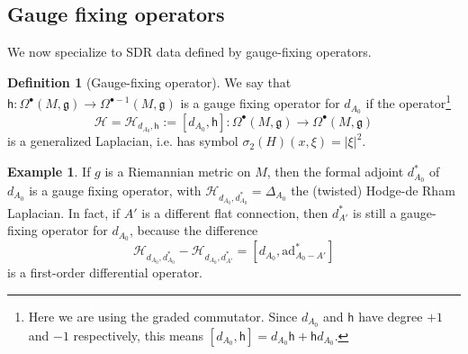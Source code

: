 \documentclass[11pt,a4paper]{amsart}
\theoremstyle{plain} %
\newtheorem{cor}[thm]{Corollary}
\theoremstyle{definition}
\newtheorem{defn}[thm]{Definition}
\newtheorem{expl}[thm]{Example}
\theoremstyle{remark}
\newcommand{\g}{\mathfrak{g}}
\newcommand{\sh}{\mathsf{h}}
\newcommand{\M}{\mathcal{M}}
\newcommand{\ad}{\mathrm{ad}}
\newcommand{\HHH}{\mathcal{H}}
\begin{document}
{%

\subsection{Gauge fixing operators}
We now specialize to SDR data defined by gauge-fixing operators. 
\begin{defn}[Gauge-fixing operator]
    We say that $\sh\colon \Omega^{\bullet}(M,\g) \to \Omega^{\bullet -1}(M,\g)$ is a gauge fixing operator for $d_{A_0}$ if the operator\footnote{Here we are using the graded commutator. Since $d_{A_0}$ and $\sh$ have degree $+1$ and $-1$ respectively, this means $[d_{A_0},\sh] = d_{A_0}\sh + \sh 
    d_{A_0}$.} 
    \begin{equation} \HHH=\HHH_{d_{A_0},\sh}:=[d_{A_0},\sh] \colon \Omega^{\bullet}(M,\g) \to \Omega^{\bullet}(M,\g) 
    \end{equation}
    is a generalized Laplacian, i.e. has symbol $\sigma_2(H)(x,\xi) = |\xi|^2$.
\end{defn}
\begin{expl}
    If $g$ is a Riemannian metric on $M$, then the formal adjoint $d^*_{A_0}$ of $d_{A_0}$ is a gauge fixing operator, with $\HHH_{d_{A_0},d^*_{A_0}} = \Delta_{A_0}$ the (twisted) Hodge-de Rham Laplacian. In fact, if $A'$ is a different flat connection, then $d^*_{A'}$ is still a gauge-fixing operator for $d_{A_0}$, because the difference 
    $$\HHH_{d_{A_0},d^*_{A_0}} - \HHH_{d_{A_0},d^*_{A'}} = [d_{A_0}, \ad_{A_0-A'}^*] $$ 
    is a first-order differential operator. 
\end{expl}


}
\end{document}
